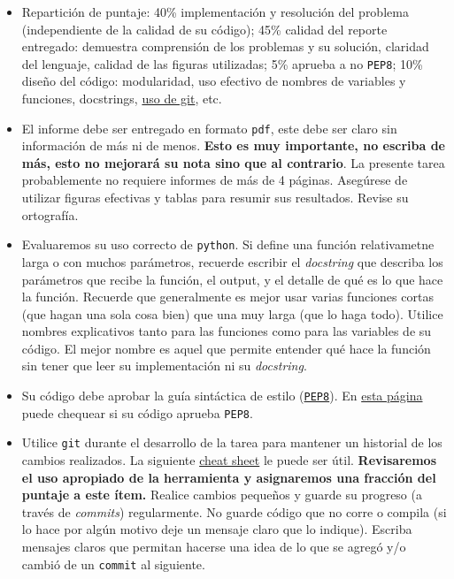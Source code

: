 \documentclass[letter, 11pt]{article}
\begin{document}
\begin{itemize}

\item Repartición de puntaje: 40\% implementación y resolución del problema
  (independiente de la calidad de su código); 45\% calidad del reporte
  entregado: demuestra comprensión de los problemas y su solución, claridad del
  lenguaje, calidad de las figuras utilizadas; 5\% aprueba a no \texttt{PEP8};
  10\% diseño del código: modularidad, uso efectivo de nombres de variables y
  funciones, docstrings, \underline{uso de git}, etc.

\item El informe debe ser entregado en formato \texttt{pdf}, este debe ser
  claro sin información de más ni de menos. \textbf{Esto es muy importante, no
  escriba de más, esto no mejorará su nota sino que al contrario}. La presente
  tarea probablemente no requiere informes de más de 4 páginas. Asegúrese de
  utilizar figuras efectivas y tablas para resumir sus resultados. Revise su
  ortografía.

  \item Evaluaremos su uso correcto de \texttt{python}. Si define una función
  relativametne larga o con muchos parámetros, recuerde escribir el
  \emph{docstring} que describa los parámetros que recibe la función, el
  output, y el detalle de qué es lo que hace la función. Recuerde que
  generalmente es mejor usar varias funciones cortas (que hagan una sola cosa
  bien) que una muy larga (que lo haga todo).  Utilice nombres explicativos
  tanto para las funciones como para las variables de su código. El mejor
  nombre es aquel que permite entender qué hace la función sin tener que leer
  su implementación ni su \emph{docstring}.

\item Su código debe aprobar la guía sintáctica de estilo
  (\href{https://www.python.org/dev/peps/pep-0008/}{\texttt{PEP8}}). En
  \href{http://pep8online.com}{esta página} puede chequear si su código aprueba
  \texttt{PEP8}.

\item Utilice \texttt{git} durante el desarrollo de la tarea para mantener un
  historial de los cambios realizados. La siguiente
  \href{https://education.github.com/git-cheat-sheet-education.pdf}{cheat
    sheet} le puede ser útil. {\bf Revisaremos el uso apropiado de la
  herramienta y asignaremos una fracción del puntaje a este ítem.} Realice
  cambios pequeños y guarde su progreso (a través de \emph{commits})
  regularmente. No guarde código que no corre o compila (si lo hace por algún
  motivo deje un mensaje claro que lo indique). Escriba mensajes claros que
  permitan hacerse una idea de lo que se agregó y/o cambió de un
  \texttt{commit} al siguiente.


\end{itemize}
\end{document}
